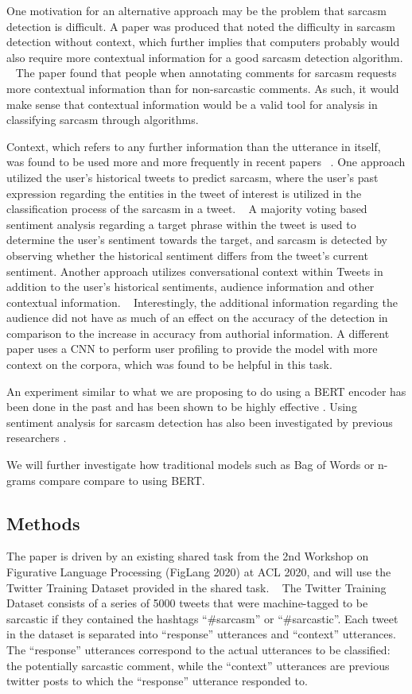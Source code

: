 \documentclass[11pt,a4paper]{article}
\begin{document}
One motivation for an alternative approach may be the problem that sarcasm detection is difficult. A paper was produced that noted the difficulty in sarcasm detection without context, which further implies that computers probably would also require more contextual information for a good sarcasm detection algorithm. ~\cite{Wallace2014HumansRC} The paper found that people when annotating comments for sarcasm requests more contextual information than for non-sarcastic comments. As such, it would make sense that contextual information would be a valid tool for analysis in classifying sarcasm through algorithms. 

Context, which refers to any further information than the utterance in itself, ~\cite{10.1145/3124420} was found to be used more and more frequently in recent papers ~\cite{Ghosh-Muresan}. One approach
utilized the user’s historical tweets to predict sarcasm, where the user’s past expression regarding the entities in the tweet of interest is utilized in the classification process
of the sarcasm in a tweet. ~\cite{khattri-etal-2015-sentiment} A majority voting based sentiment analysis regarding a target phrase within the tweet is used to determine the user’s
sentiment towards the target, and sarcasm is detected by observing whether the historical sentiment differs from the tweet’s current sentiment. Another approach utilizes
conversational context within Tweets in addition to the user’s historical sentiments, audience information and other contextual information. ~\cite{bamman2015contextualized}
Interestingly, the additional information regarding the audience did not have as much of an effect on the accuracy of the detection in comparison to the increase in accuracy from
authorial information. 
A different paper uses a CNN to perform user profiling to provide the model with more context on the corpora, which was found to be helpful in this task\cite{hazarika}.

An experiment similar to what we are proposing to do using a BERT encoder has been done in the past and has been shown to be highly effective \cite{van-hee-etal-2018-semeval}.
Using sentiment analysis for sarcasm detection has also been investigated by previous researchers \cite{abu-farha}.

We will further investigate how traditional models such as Bag of Words or n-grams compare compare to using BERT.

\subsection{Methods}
The paper is driven by an existing shared task from the 2nd Workshop on Figurative Language Processing (FigLang 2020) at ACL 2020, and will use the Twitter Training Dataset
provided in the shared task. ~\cite{Ghosh-Muresan} The Twitter Training Dataset consists of a series of 5000 tweets that were machine-tagged to be sarcastic if they contained the hashtags ``\#sarcasm'' or ``\#sarcastic''.  Each tweet in the dataset is separated into “response” utterances and “context” utterances. The “response” utterances correspond
to the actual utterances to be classified: the potentially sarcastic comment, while the “context” utterances are previous twitter posts to which the “response” utterance responded to. 
\end{document}
